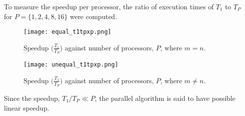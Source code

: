\documentclass[usletter, 11pt]{extarticle}
\begin{document}
        \clearpage
        \newpage
        To measure the speedup per processor, the ratio of execution times of
        $T_1$ to $T_P$ for $P=\{1,2,4,8,16\}$ were computed.

        \begin{figure}[ht]
            \begin{center}
                \texttt{[image: equal\_t1tpxp.png]}
                \caption{$\text{Speedup } \bigg(\frac{T_1}{T_P} \bigg)$ against
                number of processors, $P$, where $m=n$.} \label{equal_t1tpxp}
            \end{center}
        \end{figure}

        \begin{figure}[ht]
            \begin{center}
                \texttt{[image: unequal\_t1tpxp.png]}
                \caption{$\text{Speedup } \bigg(\frac{T_1}{T_P} \bigg)$ against
                number of processors, $P$, where $m\ne n$. }
                \label{unequal_t1tpxp}
            \end{center}
        \end{figure}

        Since the speedup, $T_1/T_P \ll P$, the parallel algorithm is said to
        have possible linear speedup.

    \clearpage
    \newpage
    
\end{document}
